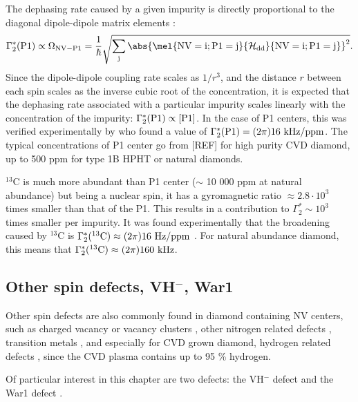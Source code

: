 \documentclass[a4paper,11pt]{report}
\begin{document}
\begin{refsection}
The dephasing rate caused by a given impurity is directly proportional to the diagonal dipole-dipole matrix elements \citep{bauch2020decoherence}: 
\begin{equation}
\Gamma_2^*(\rm P1) \propto \Omega_{\rm NV-P1}=\frac{1}{\hbar}\sqrt{\sum_j \abs{\mel{NV=i;P1=j}{\mathcal{H}_{\rm dd}}{NV=i;P1=j}}^2}.
\label{Gamma2 P1}
\end{equation}
Since the dipole-dipole coupling rate scales as $1/r^3$, and the distance $r$ between each spin scales as the inverse cubic root of the concentration,  it is expected that the dephasing rate associated with a particular impurity scales linearly with the concentration of the impurity: $\Gamma_2^*(\rm P1) \propto [P1]$. In the case of P1 centers, this was verified experimentally by \citep{bauch2020decoherence} who found a value of $\Gamma_2^*(\rm P1)= (2 \pi) 16\ \rm kHz/ppm$. The typical concentrations of P1 center go from [REF] for high purity CVD diamond, up to 500 ppm for type 1B HPHT or natural diamonds.

$^{13}$C is much more abundant than P1 center ($\sim$ 10 000 ppm at natural abundance) but being a nuclear spin, it has a gyromagnetic ratio $\approx 2.8\cdot 10^3$ times smaller than that of the P1. This results in a contribution to $\Gamma_2^* \sim 10^3$ times smaller per impurity. It was found experimentally that the broadening caused by $^{13}$C is $\Gamma_2^*(^{13}\rm C ) \approx (2 \pi) 16\ \rm Hz/ppm$ \citep{van1997dependences, barry2020sensitivity}. For natural abundance diamond, this means that $\Gamma_2^*(^{13}\rm C ) \approx (2 \pi) 160\ \rm kHz$.

\subsection{Other spin defects, VH$^-$, War1}
\label{other defects}
Other spin defects are also commonly found in diamond containing NV centers, such as charged vacancy or vacancy clusters \citep{hounsome2006origin}, other nitrogen related defects \citep{newton2007epr}, transition metals \citep{isoya1990fourier}, and especially for CVD grown diamond, hydrogen related defects \citep{hartland2014study}, since the CVD plasma contains up to 95 \% hydrogen.

Of particular interest in this chapter are two defects: the VH$^-$ defect \citep{glover2003hydrogen, glover2004hydrogen} and the War1 defect \citep{cruddace2007magnetic}. 


\end{refsection}
\end{document}
